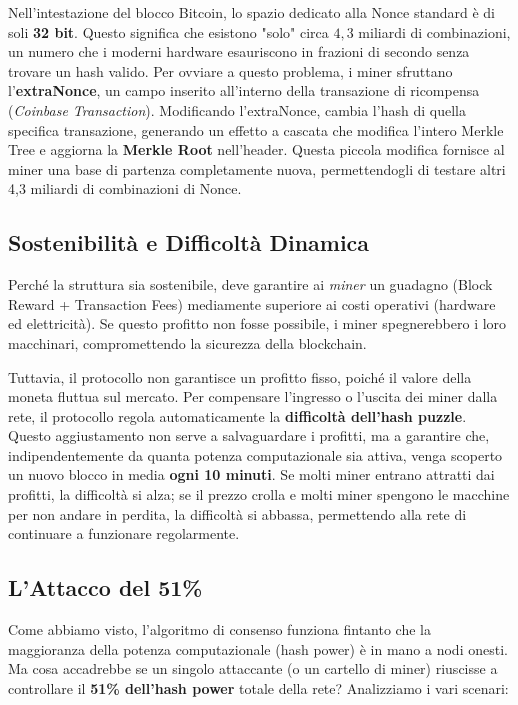 Nell'intestazione del blocco Bitcoin, lo spazio dedicato alla Nonce standard è di soli \textbf{32 bit}. Questo significa che esistono "solo" circa $4,3$ miliardi di combinazioni, un numero che i moderni hardware esauriscono in frazioni di secondo senza trovare un hash valido. 
Per ovviare a questo problema, i miner sfruttano l'\textbf{extraNonce}, un campo inserito all'interno della transazione di ricompensa (\textit{Coinbase Transaction}). Modificando l'extraNonce, cambia l'hash di quella specifica transazione, generando un effetto a cascata che modifica l'intero Merkle Tree e aggiorna la \textbf{Merkle Root} nell'header. Questa piccola modifica fornisce al miner una base di partenza completamente nuova, permettendogli di testare altri 4,3 miliardi di combinazioni di Nonce.

\subsection*{Sostenibilità e Difficoltà Dinamica}
Perché la struttura sia sostenibile, deve garantire ai \textit{miner} un guadagno (Block Reward + Transaction Fees) mediamente superiore ai costi operativi (hardware ed elettricità). Se questo profitto non fosse possibile, i miner spegnerebbero i loro macchinari, compromettendo la sicurezza della blockchain. 

Tuttavia, il protocollo non garantisce un profitto fisso, poiché il valore della moneta fluttua sul mercato. Per compensare l'ingresso o l'uscita dei miner dalla rete, il protocollo regola automaticamente la \textbf{difficoltà dell'hash puzzle}. Questo aggiustamento non serve a salvaguardare i profitti, ma a garantire che, indipendentemente da quanta potenza computazionale sia attiva, venga scoperto un nuovo blocco in media \textbf{ogni 10 minuti}. Se molti miner entrano attratti dai profitti, la difficoltà si alza; se il prezzo crolla e molti miner spengono le macchine per non andare in perdita, la difficoltà si abbassa, permettendo alla rete di continuare a funzionare regolarmente.

\subsection*{L'Attacco del 51\%}
Come abbiamo visto, l'algoritmo di consenso funziona fintanto che la maggioranza della potenza computazionale (hash power) è in mano a nodi onesti. Ma cosa accadrebbe se un singolo attaccante (o un cartello di miner) riuscisse a controllare il \textbf{51\% dell'hash power} totale della rete? Analizziamo i vari scenari:


